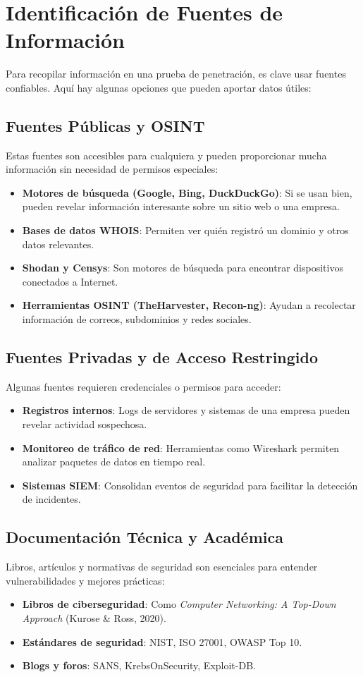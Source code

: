 \section{Identificación de Fuentes de Información}

Para recopilar información en una prueba de penetración, es clave usar fuentes confiables. Aquí hay algunas opciones que pueden aportar datos útiles:

\subsection{Fuentes Públicas y OSINT}
Estas fuentes son accesibles para cualquiera y pueden proporcionar mucha información sin necesidad de permisos especiales:
\begin{itemize}
    \item \textbf{Motores de búsqueda (Google, Bing, DuckDuckGo)}: Si se usan bien, pueden revelar información interesante sobre un sitio web o una empresa.
    \item \textbf{Bases de datos WHOIS}: Permiten ver quién registró un dominio y otros datos relevantes.
    \item \textbf{Shodan y Censys}: Son motores de búsqueda para encontrar dispositivos conectados a Internet.
    \item \textbf{Herramientas OSINT (TheHarvester, Recon-ng)}: Ayudan a recolectar información de correos, subdominios y redes sociales.
\end{itemize}

\subsection{Fuentes Privadas y de Acceso Restringido}
Algunas fuentes requieren credenciales o permisos para acceder:
\begin{itemize}
    \item \textbf{Registros internos}: Logs de servidores y sistemas de una empresa pueden revelar actividad sospechosa.
    \item \textbf{Monitoreo de tráfico de red}: Herramientas como Wireshark permiten analizar paquetes de datos en tiempo real.
    \item \textbf{Sistemas SIEM}: Consolidan eventos de seguridad para facilitar la detección de incidentes.
\end{itemize}

\subsection{Documentación Técnica y Académica}
Libros, artículos y normativas de seguridad son esenciales para entender vulnerabilidades y mejores prácticas:
\begin{itemize}
    \item \textbf{Libros de ciberseguridad}: Como \textit{Computer Networking: A Top-Down Approach} (Kurose \& Ross, 2020).
    \item \textbf{Estándares de seguridad}: NIST, ISO 27001, OWASP Top 10.
    \item \textbf{Blogs y foros}: SANS, KrebsOnSecurity, Exploit-DB.
\end{itemize}

